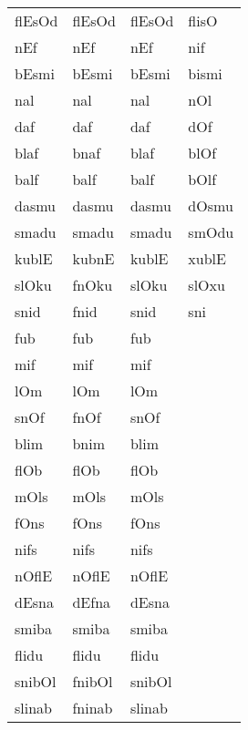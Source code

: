 \begin{appendix}
\begin{longtable}[t]{llll}
flEsOd & flEsOd & flEsOd & flisO\\
nEf & nEf & nEf & nif\\
bEsmi & bEsmi & bEsmi & bismi\\
nal & nal & nal & nOl\\
daf & daf & daf & dOf\\
blaf & bnaf & blaf & blOf\\
balf & balf & balf & bOlf\\
dasmu & dasmu & dasmu & dOsmu\\
smadu & smadu & smadu & smOdu\\
kublE & kubnE & kublE & xublE\\
slOku & fnOku & slOku & slOxu\\
snid & fnid & snid & sni\\
fub & fub & fub & \\
mif & mif & mif & \\
lOm & lOm & lOm & \\
snOf & fnOf & snOf & \\
blim & bnim & blim & \\
flOb & flOb & flOb & \\
mOls & mOls & mOls & \\
fOns & fOns & fOns & \\
nifs & nifs & nifs & \\
nOflE & nOflE & nOflE & \\
dEsna & dEfna & dEsna & \\
smiba & smiba & smiba & \\
flidu & flidu & flidu & \\
snibOl & fnibOl & snibOl & \\
slinab & fninab & slinab & \\*
\end{longtable}
\endgroup{}
\end{appendix}
